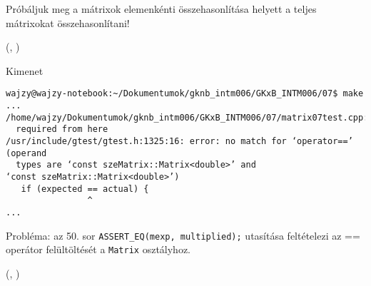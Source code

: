 \begin{frame}
  Próbáljuk meg a mátrixok elemenkénti összehasonlítása helyett a teljes mátrixokat összehasonlítani!
  \begin{exampleblock}{ %
    (, %
     )}
    \scriptsize
    
  \end{exampleblock}
\end{frame}

\begin{frame}
  \begin{exampleblock}{}
    
  \end{exampleblock}
\end{frame}

\begin{frame}[fragile]
  \begin{block}{Kimenet}
    \footnotesize
    \begin{verbatim}
wajzy@wajzy-notebook:~/Dokumentumok/gknb_intm006/GKxB_INTM006/07$ make
...
/home/wajzy/Dokumentumok/gknb_intm006/GKxB_INTM006/07/matrix07test.cpp:50:3: 
  required from here
/usr/include/gtest/gtest.h:1325:16: error: no match for ‘operator==’ (operand 
  types are ‘const szeMatrix::Matrix<double>’ and 
‘const szeMatrix::Matrix<double>’)
   if (expected == actual) {
                ^
...
\end{verbatim}
  \end{block}
  \vfill
  Probléma: az 50. sor \texttt{ASSERT\_EQ(mexp, multiplied);} utasítása feltételezi az == operátor felültöltését a 
\texttt{Matrix} osztályhoz.
\end{frame}

\begin{frame}
  \begin{exampleblock}{ %
    (, %
     )}
    \footnotesize
    
    
    
    
  \end{exampleblock}
\end{frame}

